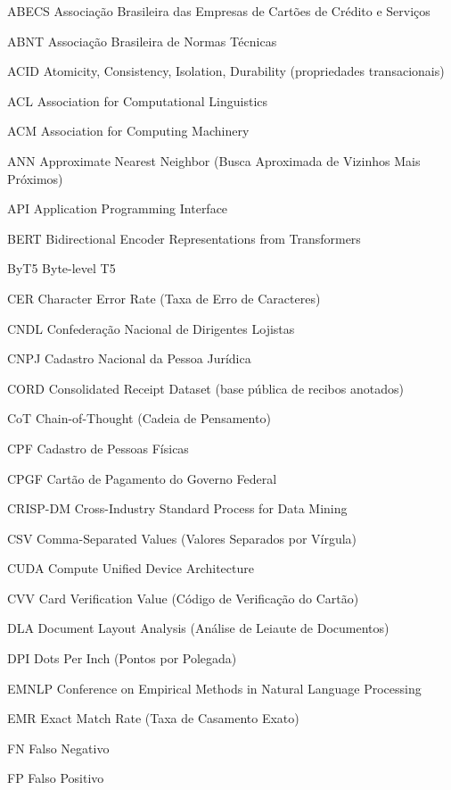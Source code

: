 \begin{siglas}
	\item[ABECS] Associação Brasileira das Empresas de Cartões de Crédito e Serviços
	\item[ABNT] Associação Brasileira de Normas Técnicas
	\item[ACID] Atomicity, Consistency, Isolation, Durability (propriedades transacionais)
	\item[ACL] Association for Computational Linguistics
	\item[ACM] Association for Computing Machinery
	\item[ANN] Approximate Nearest Neighbor (Busca Aproximada de Vizinhos Mais Próximos)
	\item[API] Application Programming Interface
	\item[BERT] Bidirectional Encoder Representations from Transformers
	\item[ByT5] Byte-level T5
	\item[CER] Character Error Rate (Taxa de Erro de Caracteres)
	\item[CNDL] Confederação Nacional de Dirigentes Lojistas
	\item[CNPJ] Cadastro Nacional da Pessoa Jurídica
	\item[CORD] Consolidated Receipt Dataset (base pública de recibos anotados)
	\item[CoT] Chain-of-Thought (Cadeia de Pensamento)
	\item[CPF] Cadastro de Pessoas Físicas
	\item[CPGF] Cartão de Pagamento do Governo Federal
	\item[CRISP-DM] Cross-Industry Standard Process for Data Mining
	\item[CSV] Comma-Separated Values (Valores Separados por Vírgula)
	\item[CUDA] Compute Unified Device Architecture
	\item[CVV] Card Verification Value (Código de Verificação do Cartão)
	\item[DLA] Document Layout Analysis (Análise de Leiaute de Documentos)
	\item[DPI] Dots Per Inch (Pontos por Polegada)
	\item[EMNLP] Conference on Empirical Methods in Natural Language Processing
	\item[EMR] Exact Match Rate (Taxa de Casamento Exato)
	\item[FN] Falso Negativo
	\item[FP] Falso Positivo

\end{siglas}
